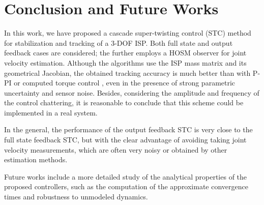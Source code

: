 \section{Conclusion and Future Works}

In this work, we have proposed a cascade super-twisting control (STC) method for stabilization and tracking of a 3-DOF ISP.
%
Both full state and output feedback cases are considered; the further employs a HOSM observer for joint velocity estimation.
%
Although the algorithms use the ISP mass matrix and its geometrical Jacobian, the obtained tracking accuracy is much better than with P-PI or computed torque control \cite{Reis2018}, even in the presence of strong parametric uncertainty and sensor noise.
%
Besides, considering the amplitude and frequency of the control chattering, it is reasonable to conclude that this scheme could be implemented in a real system.

In the general, the performance of the output feedback STC is very close to the full state feedback STC, but with the clear advantage of avoiding taking joint velocity measurements, which are often very noisy or obtained by other estimation methods.

Future works include a more detailed study of the analytical properties of the proposed controllers, such as the computation of the approximate convergence times and robustness to unmodeled dynamics.